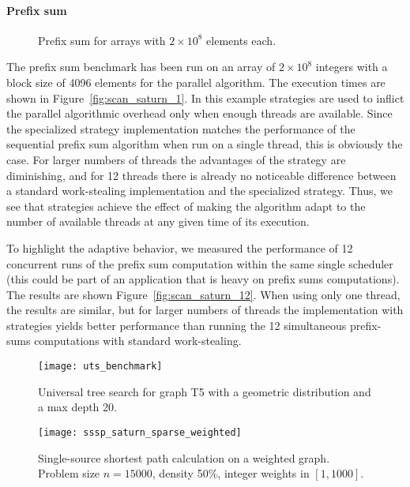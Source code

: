 \documentclass[a4paper,11pt]{article}
\begin{document}
\paragraph{Prefix sum}

\begin{figure}
\centering
{}
\caption{Prefix sum for arrays with $2\times10^8$ elements each.}
\end{figure}

The prefix sum benchmark has been run on an array of $2\times 10^8$
integers with a block size of 4096 elements for the parallel
algorithm.  The execution times are shown in
Figure~\ref{fig:scan_saturn_1}.  In this example strategies are used
to inflict the parallel algorithmic overhead only when enough threads
are available. Since the specialized strategy implementation matches
the performance of the sequential prefix sum algorithm when run on a
single thread, this is obviously the case. For larger numbers of
threads the advantages of the strategy are diminishing, and for 12
threads there is already no noticeable difference between a standard
work-stealing implementation and the specialized strategy. Thus, we
see that strategies achieve the effect of making the algorithm adapt
to the number of available threads at any given time of its execution.

To highlight the adaptive behavior, we measured the performance of 12
concurrent runs of the prefix sum computation within the same single
scheduler (this could be part of an application that is heavy on
prefix sums computations). The results are shown
Figure~\ref{fig:scan_saturn_12}. When using only one thread, the
results are similar, but for larger numbers of threads the
implementation with strategies yields better performance than running
the 12 simultaneous prefix-sums computations with standard
work-stealing.

\begin{figure}
\centering
\begin{minipage}[t]{0.45\textwidth}
\texttt{[image: uts\_benchmark]}
\caption{Universal tree search for graph T5 with a geometric distribution and a max depth 20.}
\label{fig:uts_result}
\end{minipage}
\hspace{0.05\textwidth}
\begin{minipage}[t]{0.45\textwidth}
\texttt{[image: sssp\_saturn\_sparse\_weighted]}
\caption{Single-source shortest path calculation on a weighted graph. Problem size $n=15000$, density 50\%, integer weights in $[1,1000]$.}
\label{fig:sssp_saturn_sparse_weighted}
\end{minipage}
\end{figure}
\end{document}
